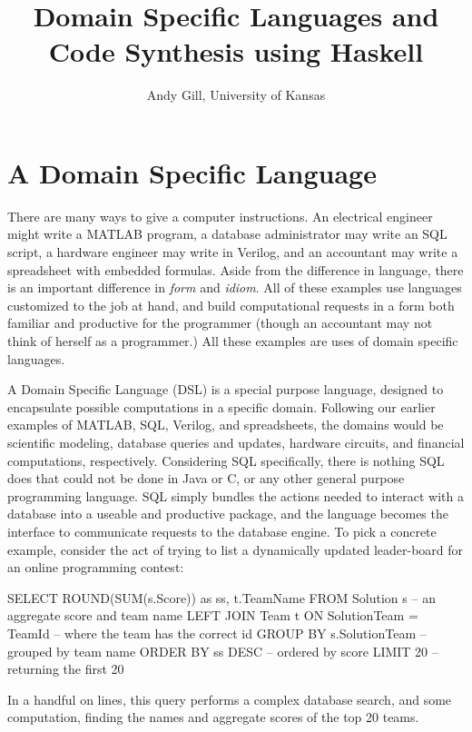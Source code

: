 \documentclass[11pt]{article}
\begin{document}
\title{Domain Specific Languages and Code Synthesis using Haskell}
\author{Andy Gill, University of Kansas}
\maketitle

\section{A Domain Specific Language}

There are many ways to give a computer instructions.
%
An electrical engineer might write a MATLAB program,
a database administrator may write an SQL script,
a hardware engineer may write in Verilog,
and an accountant may write a spreadsheet
with embedded formulas.
%
Aside from the difference in language, there is an
important difference in {\em form\/} and {\em idiom\/}.
%
All of these examples use languages
customized to the job at hand, and build computational
requests in a form both familiar and productive
for the programmer (though an accountant may
not think of herself as a programmer.)
All these examples are uses of domain specific languages.

A Domain Specific Language (DSL) is a special purpose language,
designed to encapsulate possible computations in a specific
domain. Following our earlier examples of MATLAB, SQL,
Verilog, and spreadsheets, the domains would be scientific modeling,
database queries and updates, hardware circuits, and financial computations, respectively.
Considering SQL specifically, there is nothing SQL does that could not
be done in Java or C, or any other general purpose programming
language. SQL simply bundles the actions needed to
interact with a database into a useable and productive package,
and the language becomes the interface to communicate requests
to the database engine.
To pick a concrete example,
consider the act of trying to list a dynamically updated leader-board
for an online programming contest:
\begin{Code}
SELECT ROUND(SUM(s.Score)) as ss, t.TeamName FROM Solution s -- an aggregate score and team name
   LEFT JOIN Team t ON SolutionTeam = TeamId                 -- where the team has the correct id
   GROUP BY s.SolutionTeam                                   -- grouped by team name
   ORDER BY ss DESC                                          -- ordered by score
   LIMIT 20                                                  -- returning the first 20
\end{Code}
In a handful on lines, this query performs a complex
database search, and some computation, finding
the names and aggregate scores of the top 20 teams.
\end{document}
